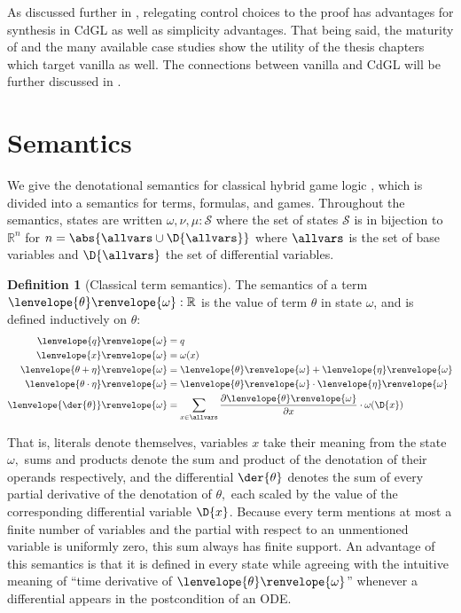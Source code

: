\documentclass[12pt]{cmuthesis}
\theoremstyle{definition}
\newtheorem{definition}{Definition}
\theoremstyle{remark}
\newcommand{\rref}[2][]{\prettyref{#2}}
\newcommand{\allstate}{\mathcal{S}}
\newcommand{\om}{\omega}
\newcommand{\CdGL}{\textsf{CdGL}\xspace}
\newcommand{\tint}[2]{\lenvelope{#1}\renvelope{#2}}
\begin{document}
As discussed further in \rref{ch:cdgl}, relegating control choices to the proof has advantages for synthesis in \CdGL as well as simplicity advantages.
That being said, the maturity of \KeYmaeraX and the many available case studies show the utility of the thesis chapters which target vanilla \dL as well.
The connections between vanilla \dL and \CdGL will be further discussed in \rref{ch:cdgl}.

\section{Semantics}
\label{sec:dgl-semantics}
We give the denotational semantics for classical hybrid game logic \dGL, which is divided into a semantics for terms, formulas, and games.
Throughout the semantics, states are written $\omega, \nu, \mu : \allstate$ where the set of states $\allstate$ is in bijection to $\mathbb{R}^n$ for $n = \abs{\allvars \cup \D{\allvars}}$ where $\allvars$ is the set of base variables and $\D{\allvars}$ the set of differential variables.

\begin{definition}[Classical term semantics]\label{def:dgl-sem-term}
The semantics of a term $\tint{\theta}{\om} : \mathbb{R}$ is the value of term $\theta$ in state $\om$, and is defined inductively on $\theta$:
\begin{align*}
  \tint{q}{\om} &= q \\
  \tint{x}{\om} &= \om(x)\\
  \tint{\theta + \eta}{\om} &= \tint{\theta}{\om} + \tint{\eta}{\om}\\
  \tint{\theta \cdot \eta}{\om} &= \tint{\theta}{\om} \cdot \tint{\eta}{\om}\\
  \tint{\der{\theta}}{\om} &= \sum_{x \in \allvars} \frac{\partial \tint{\theta}{\om}}{\partial x} \cdot \omega(\D{x})
\end{align*}
\end{definition}
That is, literals denote themselves, variables $x$ take their meaning from the state $\om,$ sums and products denote the sum and product of the denotation of their operands respectively, and the differential $\der{\theta}$ denotes the sum of every partial derivative of the denotation of $\theta,$ each scaled by the value of the corresponding differential variable $\D{x}$.
Because every term mentions at most a finite number of variables and the partial with respect to an unmentioned variable is uniformly zero, this sum always has finite support.
An advantage of this semantics is that it is defined in every state while agreeing with the intuitive meaning of ``time derivative of $\tint{\theta}{\om}$'' whenever a differential appears in the postcondition of an ODE.
\end{document}
